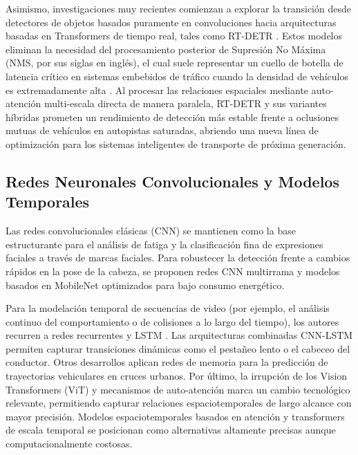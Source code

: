 Asimismo, investigaciones muy recientes comienzan a explorar la transición desde detectores de objetos basados puramente en convoluciones hacia arquitecturas basadas en Transformers de tiempo real, tales como RT-DETR \cite{yang2025computer, essahraui2025realtime}. Estos modelos eliminan la necesidad del procesamiento posterior de Supresión No Máxima (NMS, por sus siglas en inglés), el cual suele representar un cuello de botella de latencia crítico en sistemas embebidos de tráfico cuando la densidad de vehículos es extremadamente alta \cite{lin2025dangerous, satya2025utilization}. Al procesar las relaciones espaciales mediante auto-atención multi-escala directa de manera paralela, RT-DETR y sus variantes híbridas prometen un rendimiento de detección más estable frente a oclusiones mutuas de vehículos en autopistas saturadas, abriendo una nueva línea de optimización para los sistemas inteligentes de transporte de próxima generación.

\subsection{Redes Neuronales Convolucionales y Modelos Temporales}
Las redes convolucionales clásicas (CNN) \cite{liu2026research, zambrano2026monitoring} se mantienen como la base estructurante para el análisis de fatiga y la clasificación fina de expresiones faciales a través de marcas faciales. Para robustecer la detección frente a cambios rápidos en la pose de la cabeza, se proponen redes CNN multirrama \cite{l2026safestreets, ahmad2026comparative} y modelos basados en MobileNet \cite{chen2026hybrid, zia2025advancing} optimizados para bajo consumo energético. 

Para la modelación temporal de secuencias de video (por ejemplo, el análisis continuo del comportamiento o de colisiones a lo largo del tiempo), los autores recurren a redes recurrentes y LSTM \cite{kumar2026intelligent, ahmad2026comparative}. Las arquitecturas combinadas CNN-LSTM \cite{alshehri2025integrated, ijaradar2025datadriven} permiten capturar transiciones dinámicas como el pestañeo lento o el cabeceo del conductor. Otros desarrollos \cite{duan2025multimodal, arjunan2024realtime} aplican redes de memoria para la predicción de trayectorias vehiculares en cruces urbanos. Por último, la irrupción de los Vision Transformers (ViT) y mecanismos de auto-atención \cite{kumar2026intelligent, lin2025dangerous} marca un cambio tecnológico relevante, permitiendo capturar relaciones espaciotemporales de largo alcance con mayor precisión. Modelos espaciotemporales basados en atención \cite{huang2025dtldetector, alshehri2025integrated} y transformers de escala temporal \cite{kumar2025smart, tran2024transformerbased} se posicionan como alternativas altamente precisas aunque computacionalmente costosas.

